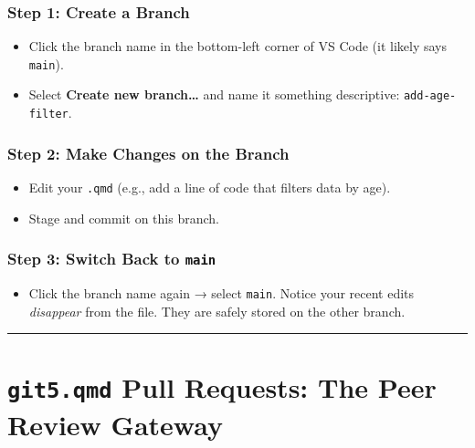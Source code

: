 \documentclass[
  letterpaper,
  DIV=11,
  numbers=noendperiod,
  oneside]{scrreprt}
\providecommand{\tightlist}{%
  \setlength{\itemsep}{0pt}\setlength{\parskip}{0pt}}
\begin{document}
\subsubsection*{Step 1: Create a Branch}\label{step-1-create-a-branch}

\begin{itemize}
\tightlist
\item
  Click the branch name in the bottom-left corner of VS Code (it likely
  says \texttt{main}).
\item
  Select \textbf{Create new branch\ldots{}} and name it something
  descriptive: \texttt{add-age-filter}.
\end{itemize}

\subsubsection*{Step 2: Make Changes on the
Branch}\label{step-2-make-changes-on-the-branch}

\begin{itemize}
\tightlist
\item
  Edit your \texttt{.qmd} (e.g., add a line of code that filters data by
  age).
\item
  Stage and commit on this branch.
\end{itemize}

\subsubsection*{\texorpdfstring{Step 3: Switch Back to
\texttt{main}}{Step 3: Switch Back to main}}\label{step-3-switch-back-to-main}

\begin{itemize}
\tightlist
\item
  Click the branch name again → select \texttt{main}. Notice your recent
  edits \emph{disappear} from the file. They are safely stored on the
  other branch.
\end{itemize}

\begin{center}\rule{0.5\linewidth}{0.5pt}\end{center}

\section*{\texorpdfstring{\texttt{git5.qmd} Pull Requests: The Peer
Review
Gateway}{git5.qmd Pull Requests: The Peer Review Gateway}}\label{git5.qmd-pull-requests-the-peer-review-gateway}
\end{document}
